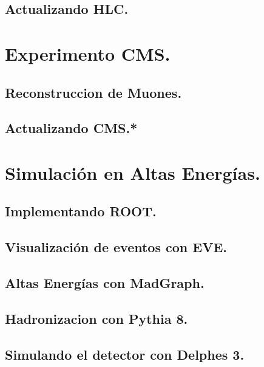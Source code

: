 \documentclass[11pt,english]{report}
\begin{document}
		\subsection{Actualizando HLC.}	
		
	
	\section{Experimento CMS.}
	
	
	
		\subsection{Reconstruccion de Muones.}
		
		\subsection{Actualizando CMS.*}	
		
		
	\section{Simulación en Altas Energías.}
	
	
		\subsection{Implementando ROOT.}
		
		
		\subsection{Visualización de eventos con EVE.}
		
		
		\subsection{Altas Energías con MadGraph.}
		

		\subsection{Hadronizacion con Pythia 8.}
		

		\subsection{Simulando el detector con Delphes 3.}
		
\end{document}
